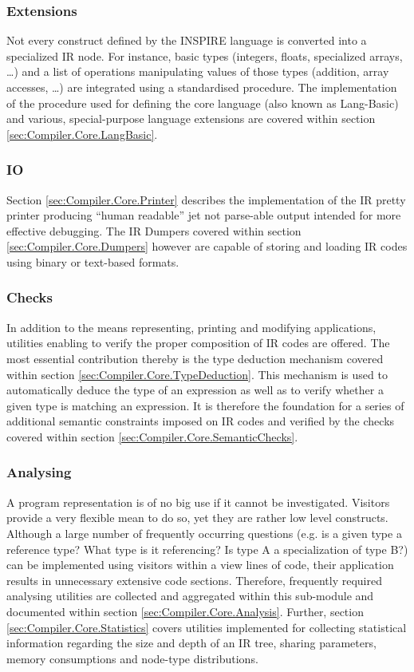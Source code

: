 \subsubsection{Extensions}
Not every construct defined by the INSPIRE language is converted into a
specialized IR node. For instance, basic types (integers,
floats, specialized arrays, \ldots) and a list of operations manipulating
values of those types (addition, array accesses, \ldots) are integrated using a
standardised procedure. The implementation of the procedure used for defining
the core language (also known as Lang-Basic) and various, special-purpose
language extensions are covered within section
\ref{sec:Compiler.Core.LangBasic}.

\subsubsection{IO}
Section \ref{sec:Compiler.Core.Printer} describes the implementation of the IR
pretty printer producing ``human readable'' jet not parse-able output intended
for more effective debugging. The IR Dumpers covered within section
\ref{sec:Compiler.Core.Dumpers} however are capable of storing and loading IR
codes using binary or text-based formats.

\subsubsection{Checks}
In addition to the means representing, printing and modifying applications,
utilities enabling to verify the proper composition of IR codes are offered. The
most essential contribution thereby is the type deduction mechanism covered
within section \ref{sec:Compiler.Core.TypeDeduction}. This mechanism is used
to automatically deduce the type of an expression as well as to verify whether a
given type is matching an expression. It is therefore the foundation for a
series of additional semantic constraints imposed on IR codes and verified by
the checks covered within section \ref{sec:Compiler.Core.SemanticChecks}. 

\subsubsection{Analysing}
A program representation is of no big use if it cannot be investigated. Visitors
provide a very flexible mean to do so, yet they are rather low level constructs.
Although a large number of frequently occurring questions (e.g. is a given type
a reference type? What type is it referencing? Is type A a specialization of
type B?) can be implemented using visitors within a view lines of code, their
application results in unnecessary extensive code sections. Therefore,
frequently required analysing utilities are collected and aggregated within this
sub-module and documented within section \ref{sec:Compiler.Core.Analysis}.
Further, section \ref{sec:Compiler.Core.Statistics} covers utilities implemented
for collecting statistical information regarding the size and depth of an IR
tree, sharing parameters, memory consumptions and node-type distributions.

